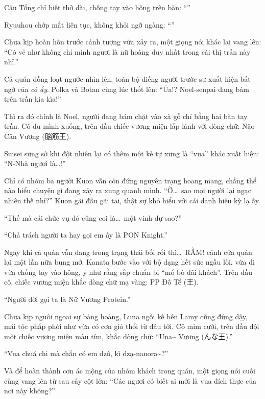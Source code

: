 \documentclass[../main.tex]{subfiles}
\begin{document}
Cậu Tổng chỉ biết thở dài, chống tay vào hông trên bàn: ``''

Ryuuhou chớp mắt liên tục, không khỏi ngỡ ngàng: ``''

Chưa kịp hoàn hồn trước cảnh tượng vừa xảy ra, một giọng nói khác lại vang lên: ``Có vẻ như không chỉ mình ngươi là nữ hoàng duy nhất trong cái thị trấn này nhỉ.''

Cả quán đồng loạt ngước nhìn lên, toàn bộ điếng người trước sự xuất hiện bất ngờ của \emph{cô ấy}. Polka và Botan cùng lúc thốt lên: ``Ủa!? Noel-senpai đang bám trên trần kia kìa!''

Thì ra đó chính là Noel, người đang bám chặt vào xà gỗ chỉ bằng hai bàn tay trần. Cô đu mình xuống, trên đầu chiếc vương miện lấp lánh với dòng chữ: Não Cân Vương (脳筋王).

Suisei sững sờ khi đột nhiên lại có thêm một kẻ tự xưng là ``vua'' khác xuất hiện: ``N-Nhà ngươi là\dots!''

Chỉ có nhóm ba người Kuon vẫn còn đứng nguyên trạng hoang mang, chẳng thể nào hiểu chuyện gì đang xảy ra xung quanh mình. ``Ờ\dots\ sao mọi người lại ngạc nhiên thế nhỉ?'' Kuon gãi đầu gãi tai, thật sự khó hiểu với cái danh hiệu kỳ lạ ấy.

``Thế mà cái chức vụ đó cũng coi là\dots\ một vinh dự sao?''

``Chả trách người ta hay gọi em ấy là PON Knight.''

Ngay khi cả quán vẫn đang trong trạng thái bối rối thì\dots\ RẦM! cánh cửa quán lại một lần nữa bung mở. Kanata bước vào với bộ dạng hết sức ngầu lòi, vừa đi vừa chống tay vào hông, y như rằng sắp chuẩn bị ``mổ bò đãi khách''. Trên đầu cô, chiếc vương miện khắc dòng chữ mạ vàng: PP Đồ Tể ({王}).

``Người đời gọi ta là Nữ Vương Protein.''

Chưa kịp nguôi ngoai sự bàng hoàng, Luna ngồi kế bên Lamy cũng đứng dậy, mái tóc phấp phới như vừa có cơn gió thổi từ đâu tới. Cô mỉm cười, trên đầu đội một chiếc vương miện màu tím, khắc dòng chữ: ``Una\~{} Vương (んな王).''

``Vua chuá chi mà chẳn có em dzô, kì dzạ-nanora\~{}?''

Và để hoàn thành cơn ác mộng của nhóm khách trong quán, một giọng nói cuối cùng vang lên từ sau cây cột lớn: ``Các ngươi có biết ai mới là vua đích thực của nơi này không?''
\end{document}
